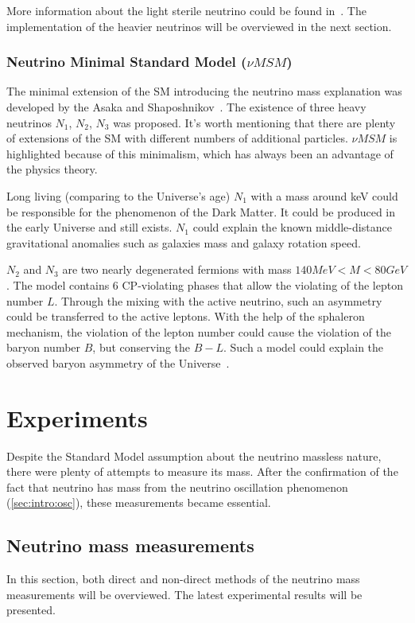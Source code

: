 \documentclass[../main.tex]{subfiles}
\begin{document}
More information about the light sterile neutrino could be found in~\cite{Abazajian2012}. The implementation of the heavier neutrinos will be overviewed in the next section.

\subsubsection{Neutrino Minimal Standard Model ($\nu MSM$)}
The minimal extension of the SM introducing the neutrino mass explanation was developed by the Asaka and Shaposhnikov~\cite{Asaka2005}. The existence of three heavy neutrinos $N_1$, $N_2$, $N_3$ was proposed. It's worth mentioning that there are plenty of extensions of the SM with different numbers of additional particles. $\nu MSM$ is highlighted because of this minimalism, which has always been an advantage of the physics theory.

Long living (comparing to the Universe's age) $N_1$ with a mass around keV could be responsible for the phenomenon of the Dark Matter. It could be produced in the early Universe and still exists. $N_1$ could explain the known middle-distance gravitational anomalies such as galaxies mass and galaxy rotation speed.

$N_2$ and $N_3$ are two nearly degenerated fermions with mass $140 MeV < M < 80 GeV$. The model contains 6 CP-violating phases that allow the violating of the lepton number $L$. Through the mixing with the active neutrino, such an asymmetry could be transferred to the active leptons. With the help of the sphaleron mechanism, the violation of the lepton number could cause the violation of the baryon number $B$, but conserving the $B-L$. Such a model could explain the observed baryon asymmetry of the Universe~\cite{Asaka2005a}.

\section{Experiments}
Despite the Standard Model assumption about the neutrino massless nature, there were plenty of attempts to measure its mass. After the confirmation of the fact that neutrino has mass from the neutrino oscillation phenomenon (\autoref{sec:intro:osc}), these measurements became essential.

\subsection{Neutrino mass measurements}
In this section, both direct and non-direct methods of the neutrino mass measurements will be overviewed. The latest experimental results will be presented.
\end{document}
